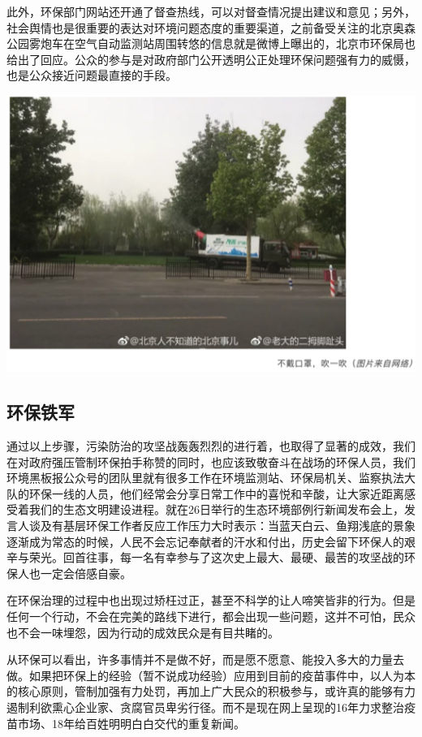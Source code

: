 \documentclass[
]{book}
\begin{document}
此外，环保部门网站还开通了督查热线，可以对督查情况提出建议和意见；另外，社会舆情也是很重要的表达对环境问题态度的重要渠道，之前备受关注的北京奥森公园雾炮车在空气自动监测站周围转悠的信息就是微博上曝出的，北京市环保局也给出了回应。公众的参与是对政府部门公开透明公正处理环保问题强有力的威慑，也是公众接近问题最直接的手段。

\includegraphics[width=6.67in]{images/fw6}

\hypertarget{ux73afux4fddux94c1ux519b}{%
\subsection{环保铁军}\label{ux73afux4fddux94c1ux519b}}

通过以上步骤，污染防治的攻坚战轰轰烈烈的进行着，也取得了显著的成效，我们在对政府强压管制环保拍手称赞的同时，也应该致敬奋斗在战场的环保人员，我们环境黑板报公众号的团队里就有很多工作在环境监测站、环保局机关、监察执法大队的环保一线的人员，他们经常会分享日常工作中的喜悦和辛酸，让大家近距离感受着我们的生态文明建设进程。就在26日举行的生态环境部例行新闻发布会上，发言人谈及有基层环保工作者反应工作压力大时表示：当蓝天白云、鱼翔浅底的景象逐渐成为常态的时候，人民不会忘记奉献者的汗水和付出，历史会留下环保人的艰辛与荣光。回首往事，每一名有幸参与了这次史上最大、最硬、最苦的攻坚战的环保人也一定会倍感自豪。

在环保治理的过程中也出现过矫枉过正，甚至不科学的让人啼笑皆非的行为。但是任何一个行动，不会在完美的路线下进行，都会出现一些问题，这并不可怕，民众也不会一味埋怨，因为行动的成效民众是有目共睹的。

从环保可以看出，许多事情并不是做不好，而是愿不愿意、能投入多大的力量去做。如果把环保上的经验（暂不说成功经验）应用到目前的疫苗事件中，以人为本的核心原则，管制加强有力处罚，再加上广大民众的积极参与，或许真的能够有力遏制利欲熏心企业家、贪腐官员卑劣行径。而不是现在网上呈现的16年力求整治疫苗市场、18年给百姓明明白白交代的重复新闻。
\end{document}
